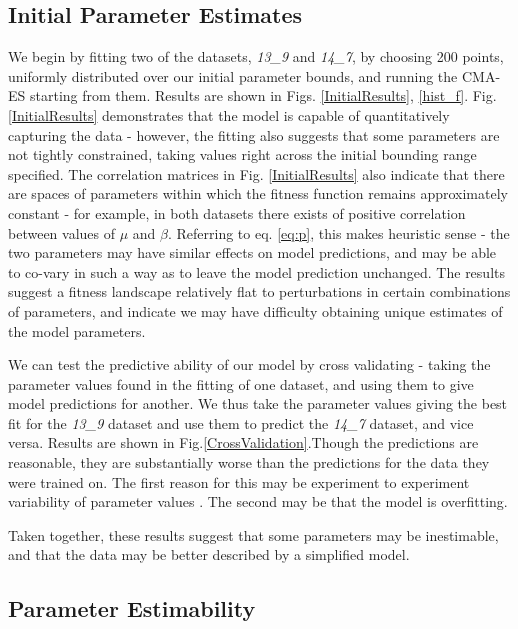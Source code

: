 \documentclass[10pt,journal]{./IEEE_latex_class/IEEEtran}
\begin{document}

\subsection{Initial Parameter Estimates}
\label{Initial Parameter Estimates}


 We begin by fitting two of the datasets, \textit{13\_9} and \textit{14\_7}, by choosing 200 points, uniformly distributed over our initial parameter bounds, and running the CMA-ES starting from them. Results are shown in Figs. \ref{InitialResults}, \ref{hist_f}. Fig. \ref{InitialResults} demonstrates that the model is capable of quantitatively capturing the data - however, the fitting also suggests that some parameters are not tightly constrained, taking values right across the initial bounding range specified. The correlation matrices in Fig. \ref{InitialResults} also indicate that there are spaces of parameters within which the fitness function remains approximately constant - for example, in both datasets there exists of positive correlation between values of $\mu$ and $\beta$. Referring to eq. \ref{eq:p}, this makes heuristic sense - the two parameters may have similar effects on model predictions, and may be able to co-vary in such a way as to leave the model prediction unchanged. The results suggest a fitness landscape relatively flat to perturbations in certain combinations of parameters, and indicate we may have difficulty obtaining unique estimates of the model parameters.
 
 We can test the predictive ability of our model by cross validating - taking the parameter values found in the fitting of one dataset, and using them to give model predictions for another. We thus take the parameter values giving the best fit for the  \textit{13\_9} dataset and use them to predict the \textit{14\_7} dataset, and vice versa. Results are shown in Fig.\ref{CrossValidation}.Though the predictions are reasonable, they are substantially worse than the predictions for the data they were trained on. The first reason for this may be experiment to experiment variability of parameter values \cite{Hu2015}. The second may be that the model is overfitting.
 
 Taken together, these results suggest that some parameters may be inestimable, and that the data may be better described by a simplified model.  
 
 \subsection{Parameter Estimability}
\label{Parameter Estimability}
 
\end{document}
